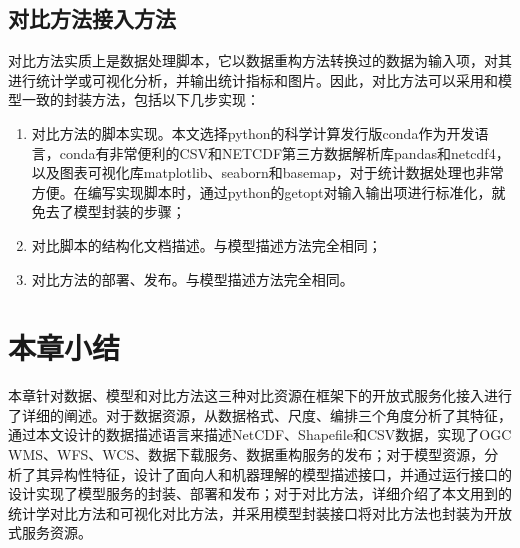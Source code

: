 \subsection{对比方法接入方法}
对比方法实质上是数据处理脚本，它以数据重构方法转换过的数据为输入项，对其进行统计学或可视化分析，并输出统计指标和图片。因此，对比方法可以采用和模型一致的封装方法，包括以下几步实现：

\begin{enumerate}[(1)]
    \item 对比方法的脚本实现。本文选择python的科学计算发行版conda作为开发语言，conda有非常便利的CSV和NETCDF第三方数据解析库pandas和netcdf4，以及图表可视化库matplotlib、seaborn和basemap，对于统计数据处理也非常方便。在编写实现脚本时，通过python的getopt对输入输出项进行标准化，就免去了模型封装的步骤；
    \item 对比脚本的结构化文档描述。与模型描述方法完全相同；
    \item 对比方法的部署、发布。与模型描述方法完全相同。
\end{enumerate}

\section{本章小结}
本章针对数据、模型和对比方法这三种对比资源在框架下的开放式服务化接入进行了详细的阐述。对于数据资源，从数据格式、尺度、编排三个角度分析了其特征，通过本文设计的数据描述语言来描述NetCDF、Shapefile和CSV数据，实现了OGC WMS、WFS、WCS、数据下载服务、数据重构服务的发布；对于模型资源，分析了其异构性特征，设计了面向人和机器理解的模型描述接口，并通过运行接口的设计实现了模型服务的封装、部署和发布；对于对比方法，详细介绍了本文用到的统计学对比方法和可视化对比方法，并采用模型封装接口将对比方法也封装为开放式服务资源。